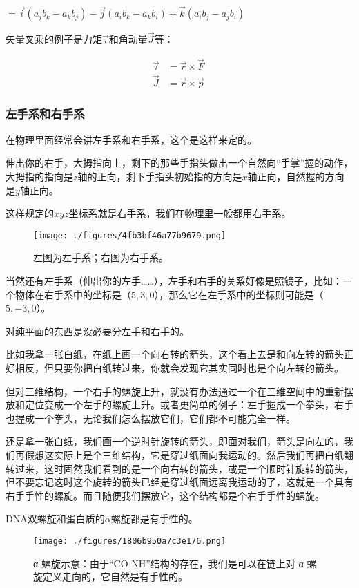 $= \vec i (a_j b_k - a_k b_j) - \vec j (a_i b_k - a_k b_i) + \vec k (a_i b_j - a_j b_i)$

矢量叉乘的例子是力矩$\vec \tau$和角动量$\vec J$等：

\begin{align}
\vec \tau &= \vec r \times \vec F \\
\vec J & =  \vec r \times \vec p~
\end{align}

\subsubsection{左手系和右手系}

在物理里面经常会讲左手系和右手系，这个是这样来定的。

伸出你的右手，大拇指向上，剩下的那些手指头做出一个自然向“手掌”握的动作，大拇指的指向是$z$轴的正向，剩下手指头初始指的方向是$x$轴正向，自然握的方向是$y$轴正向。

这样规定的$xyz$坐标系就是右手系，我们在物理里一般都用右手系。

\begin{figure}[ht]
\centering
\texttt{[image: ./figures/4fb3bf46a77b9679.png]}
\caption{左图为左⼿系；右图为右⼿系。} \label{fig_QMPre6_6}
\end{figure}

当然还有左手系（伸出你的左手……），左手和右手的关系好像是照镜子，比如：一个物体在右手系中的坐标是（$5, 3, 0$），那么它在左手系中的坐标则可能是（$5, -3, 0$）。

对纯平面的东西是没必要分左手和右手的。

比如我拿一张白纸，在纸上画一个向右转的箭头，这个看上去是和向左转的箭头正好相反，但只要你把白纸转过来，你就会发现它其实同时也是个向左转的箭头。

但对三维结构，一个右手的螺旋上升，就没有办法通过一个在三维空间中的重新摆放和定位变成一个左手的螺旋上升。或者更简单的例子：左手握成一个拳头，右手也握成一个拳头，无论我们怎么摆放它们，它们都不可能完全一样。

还是拿一张白纸，我们画一个逆时针旋转的箭头，即面对我们，箭头是向左的，我们再假想这实际上是个三维结构，它是穿过纸面向我运动的。然后我们再把白纸翻转过来，这时固然我们看到的是一个向右转的箭头，或是一个顺时针旋转的箭头，但不要忘记这时这个旋转的箭头已经是穿过纸面远离我运动的了，这就是一个具有右手手性的螺旋。而且随便我们摆放它，这个结构都是个右手手性的螺旋。

DNA双螺旋和蛋白质的$\alpha$螺旋都是有手性的。

\begin{figure}[ht]
\centering
\texttt{[image: ./figures/1806b950a7c3e176.png]}
\caption{α 螺旋示意：由于“CO-NH”结构的存在，我们是可以在链上对 α 螺旋定义⾛向的，它自然是有⼿性的。} \label{fig_QMPre6_7}
\end{figure}

